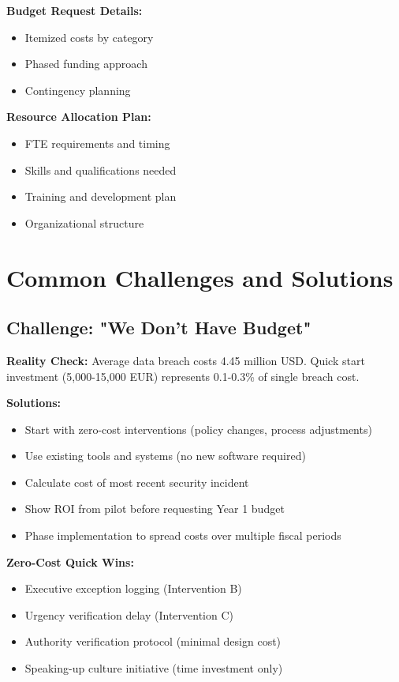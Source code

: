 \documentclass[11pt,a4paper]{article}
\begin{document}
\textbf{Budget Request Details:}
\begin{itemize}
\item Itemized costs by category
\item Phased funding approach
\item Contingency planning
\end{itemize}

\textbf{Resource Allocation Plan:}
\begin{itemize}
\item FTE requirements and timing
\item Skills and qualifications needed
\item Training and development plan
\item Organizational structure
\end{itemize}

\section{Common Challenges and Solutions}

\subsection{Challenge: "We Don't Have Budget"}

\textbf{Reality Check:}
Average data breach costs 4.45 million USD. Quick start investment (5,000-15,000 EUR) represents 0.1-0.3\% of single breach cost.

\textbf{Solutions:}
\begin{itemize}
\item Start with zero-cost interventions (policy changes, process adjustments)
\item Use existing tools and systems (no new software required)
\item Calculate cost of most recent security incident
\item Show ROI from pilot before requesting Year 1 budget
\item Phase implementation to spread costs over multiple fiscal periods
\end{itemize}

\textbf{Zero-Cost Quick Wins:}
\begin{itemize}
\item Executive exception logging (Intervention B)
\item Urgency verification delay (Intervention C)
\item Authority verification protocol (minimal design cost)
\item Speaking-up culture initiative (time investment only)
\end{itemize}
\end{document}
